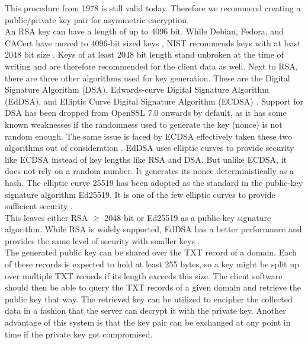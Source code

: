         This procedure from 1978 is still valid today. Therefore we recommend creating a  public/private key pair for asymmetric encryption.\\
        An RSA key can have a length of up to 4096 bit. While Debian, Fedora, and CACert have moved to 4096-bit sized keys \cite{pocock_rsa_nodate}, NIST recommends keys with at least 2048 bit size \cite{barker_transitioning_2019}. Keys of at least 2048 bit length stand unbroken at the time of writing and are therefore recommended for the client data as well. 
        Next to RSA, there are three other algorithms used for key generation. 
        These are the Digital Signature Algorithm (DSA), Edwards-curve Digital Signature Algorithm (EdDSA), and Elliptic Curve Digital Signature Algorithm (ECDSA) \cite{mody_comparing_2020}.
        Support for DSA has been dropped from OpenSSL 7.0 onwards by default, as it has some known weaknesses if the randomness used to generate the key (nonce) is not random enough. The same issue is faced by ECDSA effectively taken these two algorithms out of consideration \cite{miller_ecdsa_2020}.
        EdDSA uses elliptic curves to provide security like ECDSA instead of key lengths like RSA and DSA. But unlike ECDSA, it does not rely on a random number. It generates its nonce deterministically as a hash. The elliptic curve 25519 has been adopted as the standard
        in the public-key signature algorithm Ed25519. It is one of the few elliptic curves to provide sufficient security \cite{mody_comparing_2020}.\\
        This leaves either RSA $\geq$ 2048 bit or Ed25519 as a public-key signature algorithm.
        While RSA is widely supported, EdDSA has a better performance and provides the same level of security with smaller keys \cite{mody_comparing_2020}.\\
        
        The generated public key can be shared over the TXT record of a domain. Each of these records is expected to hold at least 255 bytes, so a key might be split up over multiple TXT records if its length exceeds this size.
        The client software should then be able to query the TXT records of a given domain and retrieve the public key that way.
        The retrieved key can be utilized to encipher the collected data in a fashion that the server can decrypt it with the private key. Another advantage of this system is that the key pair can be exchanged at any point in time if the private key got compromised.
        
